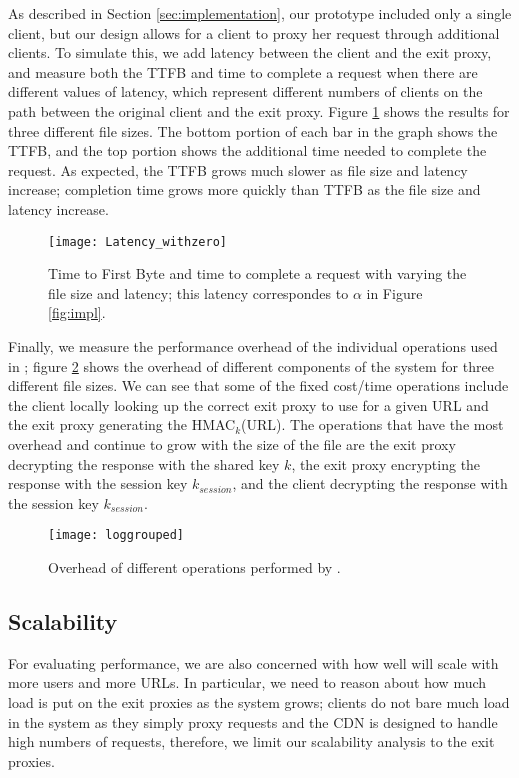 As described in Section \ref{sec:implementation}, our prototype included only a single client, but 
our design allows for a client to proxy her request through additional clients.  To simulate this, we 
add latency between the client and the exit proxy, and measure both the TTFB and time to complete a request 
when there are different values of latency, which represent different numbers of clients on the path between the 
original client and the exit proxy.  Figure \ref{fig:latency} shows the results for three different file sizes. The 
bottom portion of each bar in the graph shows the TTFB, and the top portion shows the additional time needed 
to complete the request.  As expected, the TTFB grows much slower as file size and latency increase; completion time 
grows more quickly than TTFB as the file size and latency increase.   

\begin{figure}[t!]
\centering
\texttt{[image: Latency\_withzero]}
\caption{Time to First Byte and time to complete a request with varying the file size and latency; this latency 
correspondes to $\alpha$ in Figure \ref{fig:impl}.}
\label{fig:latency}
\end{figure}

Finally, we measure the performance overhead of the individual operations used in
\system{}; figure \ref{fig:overhead2} shows
the overhead of different components of the system for three different file sizes.  We can see that some of the fixed cost/time 
operations include the client locally looking up the correct exit proxy to use for a given URL and the exit proxy generating the 
HMAC$_{k}$(URL).  The operations that have the most overhead and continue to grow with the size of the file are the exit proxy decrypting 
the response with the shared key $k$, the exit proxy encrypting the response with the session key $k_{session}$, and the client 
decrypting the response with the session key $k_{session}$.

\begin{figure}[t!]
\centering
\texttt{[image: loggrouped]}
\caption{Overhead of different operations performed by \system{}.}
\label{fig:overhead2}
\end{figure}

\subsection{Scalability}
For evaluating performance, we are also concerned with how well \system{} will scale with more users 
and more URLs.  In particular, we need to reason about how much load is put on the exit proxies as the 
system grows; clients do not bare much load in the system as they simply proxy requests and the CDN is designed 
to handle high numbers of requests, therefore, we limit our scalability analysis to the exit proxies.  

